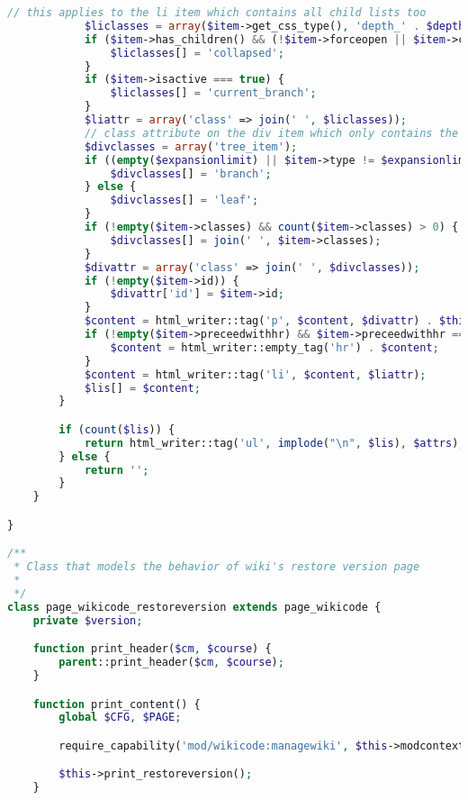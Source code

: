 \begin{lstlisting}[language=PHP]
            // this applies to the li item which contains all child lists too
            $liclasses = array($item->get_css_type(), 'depth_' . $depth);
            if ($item->has_children() && (!$item->forceopen || $item->collapse)) {
                $liclasses[] = 'collapsed';
            }
            if ($item->isactive === true) {
                $liclasses[] = 'current_branch';
            }
            $liattr = array('class' => join(' ', $liclasses));
            // class attribute on the div item which only contains the item content
            $divclasses = array('tree_item');
            if ((empty($expansionlimit) || $item->type != $expansionlimit) && ($item->children->count() > 0 || ($item->nodetype == navigation_node::NODETYPE_BRANCH && $item->children->count() == 0 && isloggedin()))) {
                $divclasses[] = 'branch';
            } else {
                $divclasses[] = 'leaf';
            }
            if (!empty($item->classes) && count($item->classes) > 0) {
                $divclasses[] = join(' ', $item->classes);
            }
            $divattr = array('class' => join(' ', $divclasses));
            if (!empty($item->id)) {
                $divattr['id'] = $item->id;
            }
            $content = html_writer::tag('p', $content, $divattr) . $this->render_navigation_node($item->children, array(), $expansionlimit, $depth + 1);
            if (!empty($item->preceedwithhr) && $item->preceedwithhr === true) {
                $content = html_writer::empty_tag('hr') . $content;
            }
            $content = html_writer::tag('li', $content, $liattr);
            $lis[] = $content;
        }

        if (count($lis)) {
            return html_writer::tag('ul', implode("\n", $lis), $attrs);
        } else {
            return '';
        }
    }

}

/**
 * Class that models the behavior of wiki's restore version page
 *
 */
class page_wikicode_restoreversion extends page_wikicode {
    private $version;

    function print_header($cm, $course) {
        parent::print_header($cm, $course);
    }

    function print_content() {
        global $CFG, $PAGE;

        require_capability('mod/wikicode:managewiki', $this->modcontext, NULL, true, 'nomanagewikipermission', 'wikicode');

        $this->print_restoreversion();
    }


\end{lstlisting}
